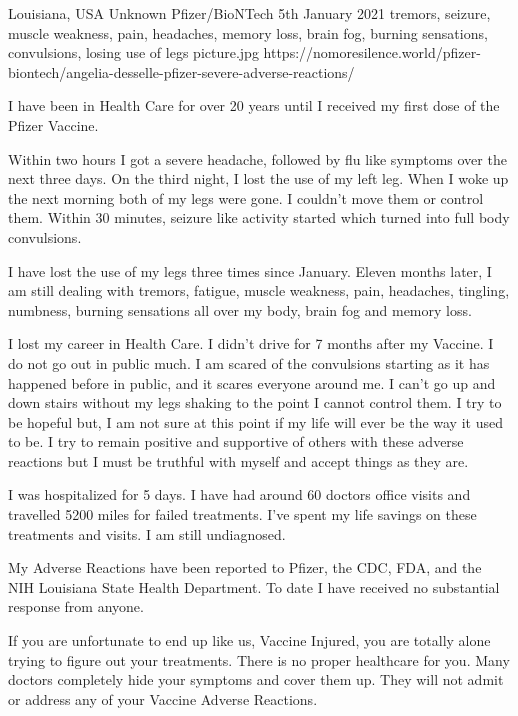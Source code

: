           {Louisiana, USA}
          {Unknown}
          {Pfizer/BioNTech}
          {5th January 2021}          
          {tremors, seizure, muscle weakness, pain, headaches, memory loss, brain
            fog, burning sensations, convulsions, losing use of legs }
          {picture.jpg}
          {https://nomoresilence.world/pfizer-biontech/angelia-desselle-pfizer-severe-adverse-reactions/}
          {

I have been in Health Care for over 20 years until I received my first dose of
the Pfizer Vaccine.

Within two hours I got a severe headache, followed by flu like symptoms over the
next three days. On the third night, I lost the use of my left leg. When I woke
up the next morning both of my legs were gone. I couldn’t move them or control
them. Within 30 minutes, seizure like activity started which turned into full
body convulsions.

I have lost the use of my legs three times since January. Eleven months later, I
am still dealing with tremors, fatigue, muscle weakness, pain, headaches,
tingling, numbness, burning sensations all over my body, brain fog and memory
loss.

I lost my career in Health Care. I didn’t drive for 7 months after my Vaccine. I
do not go out in public much. I am scared of the convulsions starting as it has
happened before in public, and it scares everyone around me. I can’t go up and
down stairs without my legs shaking to the point I cannot control them. I try to
be hopeful but, I am not sure at this point if my life will ever be the way it
used to be. I try to remain positive and supportive of others with these adverse
reactions but I must be truthful with myself and accept things as they are.

I was hospitalized for 5 days. I have had around 60 doctors office visits and
travelled 5200 miles for failed treatments. I’ve spent my life savings on these
treatments and visits. I am still undiagnosed.

My Adverse Reactions have been reported to Pfizer, the CDC, FDA, and the NIH
Louisiana State Health Department. To date I have received no substantial
response from anyone.

If you are unfortunate to end up like us, Vaccine Injured, you are totally alone
trying to figure out your treatments. There is no proper healthcare for
you. Many doctors completely hide your symptoms and cover them up. They will not
admit or address any of your Vaccine Adverse Reactions.  }
